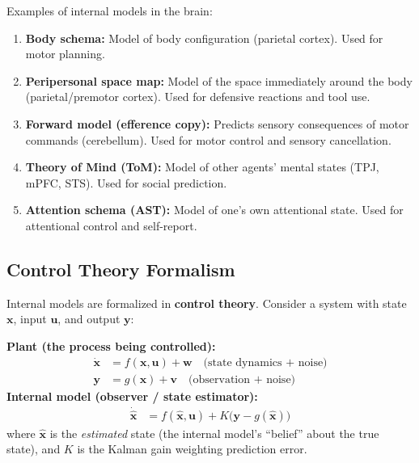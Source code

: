 \documentclass[11pt,a4paper]{report}
\begin{document}
Examples of internal models in the brain:

\begin{enumerate}[leftmargin=2em]
  \item \textbf{Body schema:} Model of body configuration (parietal cortex). Used for motor planning.
  \item \textbf{Peripersonal space map:} Model of the space immediately around the body (parietal/premotor cortex). Used for defensive reactions and tool use.
  \item \textbf{Forward model (efference copy):} Predicts sensory consequences of motor commands (cerebellum). Used for motor control and sensory cancellation.
  \item \textbf{Theory of Mind (ToM):} Model of other agents' mental states (TPJ, mPFC, STS). Used for social prediction.
  \item \textbf{Attention schema (AST):} Model of one's own attentional state. Used for attentional control and self-report.
\end{enumerate}

\subsection{Control Theory Formalism}

Internal models are formalized in \textbf{control theory}. Consider a system with state $\mathbf{x}$, input $\mathbf{u}$, and output $\mathbf{y}$:

\begin{mathbox}
\vspace{-6pt}
\textbf{Plant (the process being controlled):}
\begin{align}
  \dot{\mathbf{x}} &= f(\mathbf{x}, \mathbf{u}) + \mathbf{w} \quad\text{(state dynamics + noise)} \label{eq:plant}\\
  \mathbf{y} &= g(\mathbf{x}) + \mathbf{v} \quad\text{(observation + noise)} \label{eq:obs}
\end{align}
\textbf{Internal model (observer / state estimator):}
\begin{align}
  \dot{\hat{\mathbf{x}}} &= f(\hat{\mathbf{x}}, \mathbf{u}) + K\bigl(\mathbf{y} - g(\hat{\mathbf{x}})\bigr) \label{eq:observer}
\end{align}
where $\hat{\mathbf{x}}$ is the \emph{estimated} state (the internal model's ``belief'' about the true state), and $K$ is the Kalman gain weighting prediction error.
\vspace{-4pt}
\end{mathbox}
\end{document}

